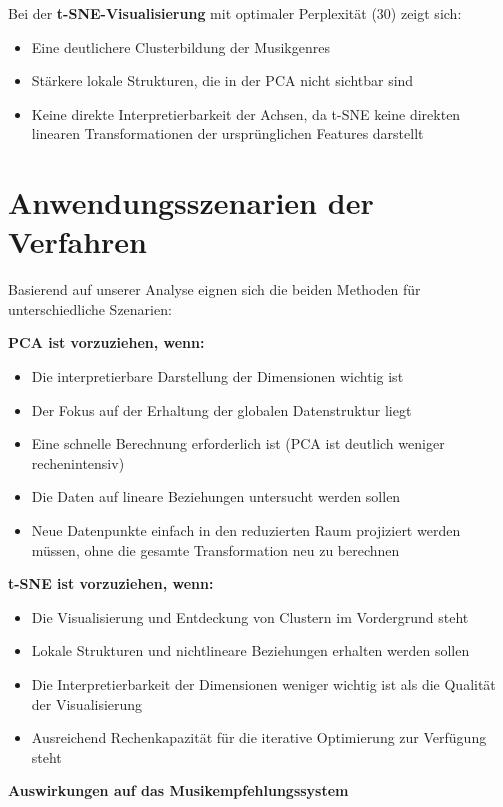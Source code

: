 Bei der \textbf{t-SNE-Visualisierung} mit optimaler Perplexität (30) zeigt sich:
\begin{itemize}
    \item Eine deutlichere Clusterbildung der Musikgenres
    \item Stärkere lokale Strukturen, die in der PCA nicht sichtbar sind
    \item Keine direkte Interpretierbarkeit der Achsen, da t-SNE keine direkten linearen Transformationen der ursprünglichen Features darstellt
\end{itemize}

\section{Anwendungsszenarien der Verfahren}

Basierend auf unserer Analyse eignen sich die beiden Methoden für unterschiedliche Szenarien:

\textbf{PCA ist vorzuziehen, wenn:}
\begin{itemize}
    \item Die interpretierbare Darstellung der Dimensionen wichtig ist
    \item Der Fokus auf der Erhaltung der globalen Datenstruktur liegt
    \item Eine schnelle Berechnung erforderlich ist (PCA ist deutlich weniger rechenintensiv)
    \item Die Daten auf lineare Beziehungen untersucht werden sollen
    \item Neue Datenpunkte einfach in den reduzierten Raum projiziert werden müssen, ohne die gesamte Transformation neu zu berechnen
\end{itemize}

\textbf{t-SNE ist vorzuziehen, wenn:}
\begin{itemize}
    \item Die Visualisierung und Entdeckung von Clustern im Vordergrund steht
    \item Lokale Strukturen und nichtlineare Beziehungen erhalten werden sollen
    \item Die Interpretierbarkeit der Dimensionen weniger wichtig ist als die Qualität der Visualisierung
    \item Ausreichend Rechenkapazität für die iterative Optimierung zur Verfügung steht
\end{itemize}

\textbf{Auswirkungen auf das Musikempfehlungssystem}


